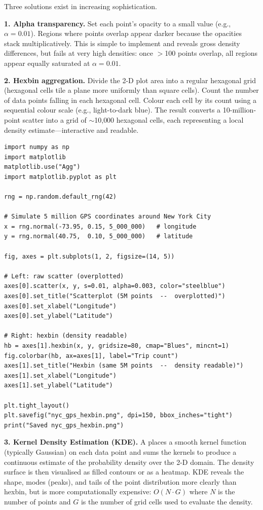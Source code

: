 Three solutions exist in increasing sophistication.

\textbf{1. Alpha transparency.} Set each point's opacity to a small value
(e.g., $\alpha = 0.01$). Regions where points overlap appear darker because
the opacities stack multiplicatively. This is simple to implement and
reveals gross density differences, but fails at very high densities: once
$>$100 points overlap, all regions appear equally saturated at $\alpha = 0.01$.

\textbf{2. Hexbin aggregation.} Divide the 2-D plot area into a regular
hexagonal grid (hexagonal cells tile a plane more uniformly than square
cells). Count the number of data points falling in each hexagonal cell.
Colour each cell by its count using a sequential colour scale (e.g.,
light-to-dark blue). The result converts a 10-million-point scatter into
a grid of $\sim$10{,}000 hexagonal cells, each representing a local density
estimate---interactive and readable.

\begin{lstlisting}[style=pyspark, caption={Hexbin scatterplot in Python (matplotlib)}]
import numpy as np
import matplotlib
matplotlib.use("Agg")
import matplotlib.pyplot as plt

rng = np.random.default_rng(42)

# Simulate 5 million GPS coordinates around New York City
x = rng.normal(-73.95, 0.15, 5_000_000)   # longitude
y = rng.normal(40.75,  0.10, 5_000_000)   # latitude

fig, axes = plt.subplots(1, 2, figsize=(14, 5))

# Left: raw scatter (overplotted)
axes[0].scatter(x, y, s=0.01, alpha=0.003, color="steelblue")
axes[0].set_title("Scatterplot (5M points  --  overplotted)")
axes[0].set_xlabel("Longitude")
axes[0].set_ylabel("Latitude")

# Right: hexbin (density readable)
hb = axes[1].hexbin(x, y, gridsize=80, cmap="Blues", mincnt=1)
fig.colorbar(hb, ax=axes[1], label="Trip count")
axes[1].set_title("Hexbin (same 5M points  --  density readable)")
axes[1].set_xlabel("Longitude")
axes[1].set_ylabel("Latitude")

plt.tight_layout()
plt.savefig("nyc_gps_hexbin.png", dpi=150, bbox_inches="tight")
print("Saved nyc_gps_hexbin.png")
\end{lstlisting}

\textbf{3. Kernel Density Estimation (KDE).} A  places a smooth kernel function (typically Gaussian) on each
data point and sums the kernels to produce a continuous estimate of the
probability density over the 2-D domain. The density surface is then
visualised as filled contours or as a heatmap. KDE reveals the shape,
modes (peaks), and tails of the point distribution more clearly than
hexbin, but is more computationally expensive: $O(N \cdot G)$ where $N$
is the number of points and $G$ is the number of grid cells used to
evaluate the density.

